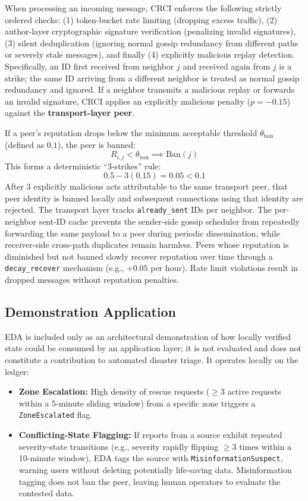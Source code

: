 \documentclass[conference]{IEEEtran}
\begin{document}
When processing an incoming message, CRCI enforces the following strictly ordered checks: (1) token-bucket rate limiting (dropping excess traffic), (2) author-layer cryptographic signature verification (penalizing invalid signatures), (3) silent deduplication (ignoring normal gossip redundancy from different paths or severely stale messages), and finally (4) explicitly malicious replay detection. Specifically, an ID first received from neighbor $j$ and received again from $j$ is a strike; the same ID arriving from a different neighbor is treated as normal gossip redundancy and ignored. If a neighbor transmits a malicious replay or forwards an invalid signature, CRCI applies an explicitly malicious penalty ($p = -0.15$) against the \textbf{transport-layer peer}.

If a peer's reputation drops below the minimum acceptable threshold $\theta_{\text{ban}}$ (defined as $0.1$), the peer is banned:
\begin{equation}
R_{i,j} < \theta_{\text{ban}} \implies \text{Ban}(j)
\end{equation}
This forms a deterministic ``3-strikes'' rule:
\begin{equation}
0.5 - 3(0.15) = 0.05 < 0.1
\end{equation}
After 3 explicitly malicious acts attributable to the same transport peer, that peer identity is banned locally and subsequent connections using that identity are rejected. The transport layer tracks \texttt{already\_sent} IDs per neighbor. The per-neighbor sent-ID cache prevents the sender-side gossip scheduler from repeatedly forwarding the same payload to a peer during periodic dissemination, while receiver-side cross-path duplicates remain harmless. Peers whose reputation is diminished but not banned slowly recover reputation over time through a \texttt{decay\_recover} mechanism (e.g., $+0.05$ per hour). Rate limit violations result in dropped messages without reputation penalties.

\subsection{Demonstration Application}
EDA is included only as an architectural demonstration of how locally verified state could be consumed by an application layer; it is not evaluated and does not constitute a contribution to automated disaster triage. It operates locally on the ledger:
\begin{itemize}
    \item \textbf{Zone Escalation:} High density of rescue requests ($\ge 3$ active requests within a 5-minute sliding window) from a specific zone triggers a \texttt{ZoneEscalated} flag.
    \item \textbf{Conflicting-State Flagging:} If reports from a source exhibit repeated severity-state transitions (e.g., severity rapidly flipping $\ge 3$ times within a 10-minute window), EDA tags the source with \texttt{MisinformationSuspect}, warning users without deleting potentially life-saving data. Misinformation tagging does not ban the peer, leaving human operators to evaluate the contested data.
\end{itemize}
\end{document}
